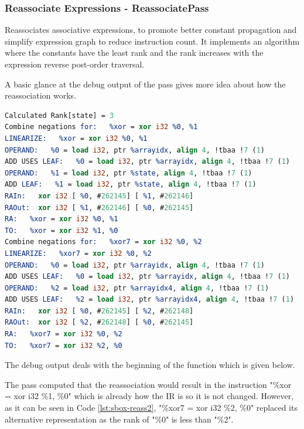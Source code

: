 \subsubsection{Reassociate Expressions - ReassociatePass}
Reassociates associative expressions, to promote better constant propagation and simplify expression graph to reduce instruction count. It implements an algorithm where the constants have the least rank and the rank increases with the expression reverse post-order traversal. 





A basic glance at the debug output of the pass gives more idea about how the reassociation works.

\begin{lstlisting}[language=llvm, style=nasm]
Calculated Rank[state] = 3
Combine negations for:   %xor = xor i32 %0, %1
LINEARIZE:   %xor = xor i32 %0, %1
OPERAND:   %0 = load i32, ptr %arrayidx, align 4, !tbaa !7 (1)
ADD USES LEAF:   %0 = load i32, ptr %arrayidx, align 4, !tbaa !7 (1)
OPERAND:   %1 = load i32, ptr %state, align 4, !tbaa !7 (1)
ADD LEAF:   %1 = load i32, ptr %state, align 4, !tbaa !7 (1)
RAIn:	xor i32	[ %0, #262145] [ %1, #262146]
RAOut:	xor i32	[ %1, #262146] [ %0, #262145]
RA:   %xor = xor i32 %0, %1
TO:   %xor = xor i32 %1, %0
Combine negations for:   %xor7 = xor i32 %0, %2
LINEARIZE:   %xor7 = xor i32 %0, %2
OPERAND:   %0 = load i32, ptr %arrayidx, align 4, !tbaa !7 (1)
ADD USES LEAF:   %0 = load i32, ptr %arrayidx, align 4, !tbaa !7 (1)
OPERAND:   %2 = load i32, ptr %arrayidx4, align 4, !tbaa !7 (1)
ADD USES LEAF:   %2 = load i32, ptr %arrayidx4, align 4, !tbaa !7 (1)
RAIn:	xor i32	[ %0, #262145] [ %2, #262148]
RAOut:	xor i32	[ %2, #262148] [ %0, #262145]
RA:   %xor7 = xor i32 %0, %2
TO:   %xor7 = xor i32 %2, %0
\end{lstlisting}

The debug output deals with the beginning of the function which is given below.



The pass computed that the reassociation would result in the instruction "\%xor = xor i32 \%1, \%0" which is already how the IR is so it is not changed. However, as it can be seen in Code \ref{lst:sbox-reass2}, "\%xor7 = xor i32 \%2, \%0" replaced its alternative representation as the rank of "\%0" is less than "\%2". 


